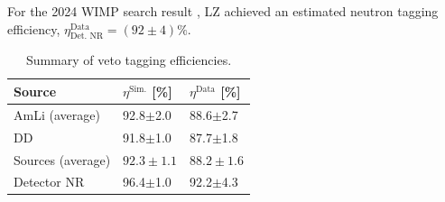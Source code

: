 For the 2024 WIMP search result \cite{LZCollaboration:2024lux}, LZ achieved an estimated neutron tagging efficiency, $\eta_\text{Det. NR}^\text{Data}=(92\pm4)\%$.

\begin{table}[!h]
	\centering
	\caption[Summary of veto tagging efficiencies.]{Summary of veto tagging efficiencies.}
	\begin{tabular}{lll}
    \hline\hline
    \textbf{Source}& \textbf{$\eta^\text{Sim.}$ [\%]}& \textbf{$\eta^\text{Data}$ [\%]}\\ 
    \hline
    AmLi (average) & 92.8$\pm$2.0 & 88.6$\pm$2.7\\
    DD & 91.8$\pm$1.0 & 87.7$\pm$1.8\\
    Sources (average)& $92.3\pm1.1$ & $88.2\pm1.6$\\
    Detector NR & 96.4$\pm$1.0 & 92.2$\pm$4.3\\
    \hline\hline
	\end{tabular}
	\label{tab:VetoEff/final_veto_efficiency}
\end{table}

\newpage

